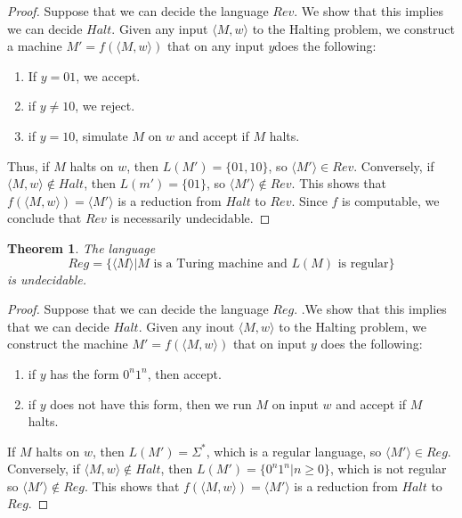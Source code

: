 \documentclass[11pt]{article}
\theoremstyle{plain} %
\newtheorem*{theorem}{Theorem}
\theoremstyle{definition}
\theoremstyle{example}
\theoremstyle{remark}
\begin{document}
\begin{proof}
Suppose that we can decide the language $Rev$. We show that this implies we can decide $Halt$. Given any input $\langle M, w \rangle$ to the Halting problem, we construct a machine $M' = f(\langle M, w \rangle)$ that on any input $y$does the following:

\begin{enumerate}
	\item If $y=01$, we accept.
	\item if $y \neq 10$, we reject.
	\item if $y = 10$, simulate $M$ on $w$ and accept if $M$ halts. 
\end{enumerate}

Thus, if $M$ halts on $w$, then $L(M') = \{ 01, 10\}$, so $\langle M'\rangle \in Rev$. Conversely, if $\langle M, w \rangle \not \in Halt$, then $L(m') = \{01\}$, so $\langle M' \rangle \not \in Rev$. This shows that $f(\langle M,w\rangle) = \langle M'\rangle$ is a reduction from $Halt$ to $Rev$. Since $f$ is computable, we conclude that $Rev$ is necessarily undecidable. 
\end{proof}

\begin{theorem}The language 
$$Reg = \{\langle M \rangle | M \text{ is a Turing machine and } L(M) \text{ is regular}\}$$ is undecidable.
\end{theorem}

\begin{proof}
Suppose that we can decide the language $Reg$. .We show that this implies that we can decide $Halt$. Given any inout $\langle M, w \rangle $ to the Halting problem, we construct the machine $M' = f(\langle M, w \rangle )$ that on input $y$ does the following:

\begin{enumerate}
	\item if $y$ has the form $0^n1^n$, then accept.
	\item if $y$ does not have this form, then we run $M$ on input $w$ and accept if $M$ halts. 
\end{enumerate}

If $M$ halts on $w$, then $L(M') = \Sigma^*$, which is a regular language, so $\langle M'\rangle \in Reg$. Conversely, if $\langle M, w \rangle \not \in Halt$, then $L(M') = \{0^n1^n| n \geq 0\}$, which is not regular so $\langle M' \rangle \not \in Reg$. This shows that $f(\langle M, w \rangle) = \langle M' \rangle$ is a reduction from $Halt$ to $Reg$. 
\end{proof}
\end{document}
